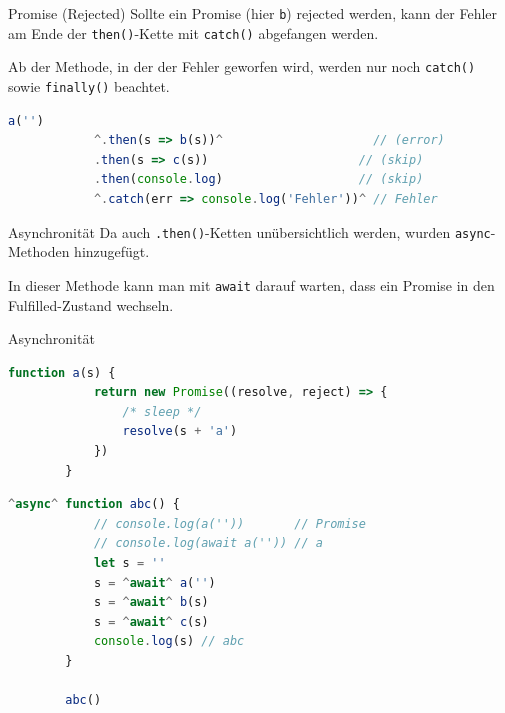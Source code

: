\begin{example}{Promise (Rejected)}
    Sollte ein Promise (hier \texttt{b}) rejected werden, kann der Fehler am Ende der \texttt{then()}-Kette mit \texttt{catch()} abgefangen werden.

    Ab der Methode, in der der Fehler geworfen wird, werden nur noch \texttt{catch()} sowie \texttt{finally()} beachtet.

    \begin{lstlisting}[language=JavaScript]
        a('')
            ^.then(s => b(s))^                     // (error)
            .then(s => c(s))                     // (skip)
            .then(console.log)                   // (skip)
            ^.catch(err => console.log('Fehler'))^ // Fehler
    \end{lstlisting}
\end{example}

\begin{defi}{Asynchronität}
    Da auch \texttt{.then()}-Ketten unübersichtlich werden, wurden \texttt{async}-Methoden hinzugefügt.

    In dieser Methode kann man mit \texttt{await} darauf warten, dass ein Promise in den Fulfilled-Zustand wechseln.
\end{defi}

\begin{example}{Asynchronität}
    \begin{lstlisting}[language=JavaScript]
        function a(s) {
            return new Promise((resolve, reject) => {
                /* sleep */
                resolve(s + 'a')
            })
        }
    \end{lstlisting}

    \begin{lstlisting}[language=JavaScript]
        ^async^ function abc() {
            // console.log(a(''))       // Promise
            // console.log(await a('')) // a
            let s = ''
            s = ^await^ a('')
            s = ^await^ b(s)
            s = ^await^ c(s)
            console.log(s) // abc
        }

        abc()
    \end{lstlisting}
\end{example}

